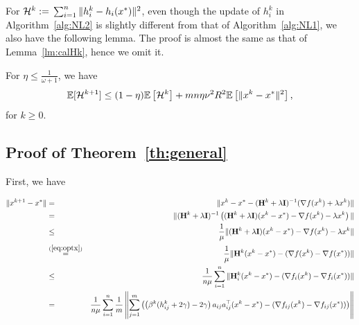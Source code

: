 \documentclass[10pt]{article}
\newcommand{\eqdef}{\; { := }\;}
\newcommand{\ExpBr}[1]{\mathbb{E}\left[#1\right]}
\newcommand{\newalpha}{h}
\newcommand{\mH}{\mathbf{H}}
\newcommand{\mI}{\mathbf{I}}
\begin{document}
For ${\cal H}^k \eqdef \sum_{i=1}^n \|h_i^k - \newalpha_i(x^*)\|^2$, even though the update of $h_i^k$ in Algorithm~\ref{alg:NL2} is slightly different from that of Algorithm~\ref{alg:NL1}, we also have the following lemma. The proof is almost the same as that of Lemma~\ref{lm:calHk}, hence we omit it. 

\begin{lemma}\label{lm:calHk-2} For $\eta \leq \frac{1}{\omega+1}$, we have 
	$$
	\mathbb{E}[{\cal H}^{k+1}] \leq  (1-\eta) \ExpBr{{\cal H}^k} + m n \eta \nu^2 R^2 \ExpBr{\|x^k - x^*\|^2}, 
	$$
	for $k\geq 0$. 
\end{lemma}


\subsection{Proof of Theorem~\ref{th:general}}


First, we have 

\begin{eqnarray*}
	\|x^{k+1} - x^*\| &=& \| x^k - x^* - (\mH^k + \lambda \mI)^{-1} (\nabla f(x^k) + \lambda x^k) \| \\
	&=& \|(\mH^k + \lambda \mI)^{-1} \left(  (\mH^k + \lambda \mI)(x^k - x^*) - \nabla f(x^k) - \lambda x^k  \right) \| \\ 
	&\leq& \frac{1}{\mu} \|  (\mH^k + \lambda \mI)(x^k - x^*) - \nabla f(x^k) - \lambda x^k  \| \\ 
	&\overset{(\ref{eq:optx})}{=}& \frac{1}{\mu} \| \mH^k (x^k - x^*) - (\nabla f(x^k) - \nabla f(x^*)) \| \\ 
	&\leq& \frac{1}{n \mu} \sum_{i=1}^n \| \mH_i^k (x^k - x^*) - (\nabla f_i(x^k) - \nabla f_i(x^*)) \| \\
	&=& \frac{1}{n \mu} \sum_{i=1}^n \frac{1}{m} \left\|  \sum_{j=1}^{m} \left( \left( \beta^k (h_{ij}^k + 2\gamma) - 2\gamma \right)a_{ij}a_{ij}^\top (x^k - x^*) -  (\nabla f_{ij}(x^k) - \nabla f_{ij}(x^*)) \right)   \right\| 
\end{eqnarray*}
\end{document}
